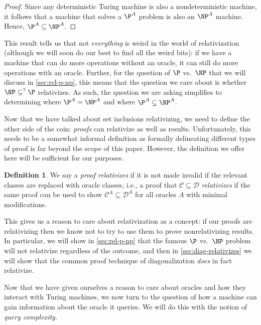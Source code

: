 \documentclass[english,12pt]{reedthesis}
\theoremstyle{plain}
\theoremstyle{definition}
\newtheorem{defn}[defn]{Definition}
\theoremstyle{remark}
\begin{document}
\begin{proof}
  Since any deterministic Turing machine is also a nondeterministic machine, it
  follows that a machine that solves a $\P^{A}$ problem is also an $\NP^{A}$
  machine. Hence, $\P^{A} \subseteq \NP^{A}$.
\end{proof}

This result tells us that not \emph{everything} is weird in the world of
relativization (although we will soon do our best to find all the weird bits):
if we have a machine that can do more operations without an oracle, it can still
do more operations with an oracle. Further, for the question of $\P$ vs.\ $\NP$
that we will discuss in \cref{sec:rel-p-np}, this means that the question we
care about is whether $\NP \subseteq^{?} \P$ relativizes. As such, the question we are
asking simplifies to determining where $\P^{A} = \NP^{A}$ and where
$\P^{A} \subsetneq \NP^{A}$.

Now that we have talked about set inclusions relativizing, we need to define the
other side of the coin: \emph{proofs} can relativize as well as results.
Unfortunately, this needs to be a somewhat informal definition as formally
delineating different types of proof is far beyond the scope of this paper.
However, the definition we offer here will be sufficient for our purposes.

\begin{defn}\label{def:relativizing-result}
  We say a \emph{proof relativizes} if it is not made invalid if the relevant
  classes are replaced with oracle classes, i.e., a proof that $\mathcal{C} \subseteq \mathcal{D}$
  \emph{relativizes} if the same proof can be used to show $\mathcal{C}^{A} \subseteq \mathcal{D}^{A}$ for
  all oracles $A$ with minimal modifications.
\end{defn}

This gives us a reason to care about relativization as a concept: if our proofs
are relativizing then we know not to try to use them to prove nonrelativizing
results. In particular, we will show in \cref{sec:rel-p-np} that the famous $\P$
vs.\ $\NP$ problem will not relativize regardless of the outcome, and then in
\cref{sec:diag-relativizes} we will show that the common proof technique of
diagonalization \emph{does} in fact relativize.

Now that we have given ourselves a reason to care about oracles and how they
interact with Turing machines, we now turn to the question of how a machine can
gain information about the oracle it queries. We will do this with the notion of
\emph{query complexity}.
\end{document}
